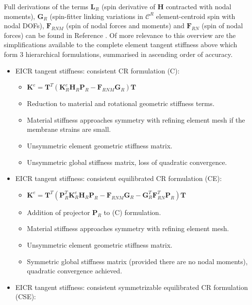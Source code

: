  Full derivations of the terms $\mathbf{L}_R$ (spin derivative of $\mathbf{H}$ contracted with nodal moments), $\mathbf{G}_R$ (spin-fitter linking variations in $\mathscr{C}^R$ element-centroid spin with nodal DOFs), $\mathbf{F}_{RNM}$ (spin of nodal forces and moments) and $\mathbf{F}_{RN}$ (spin of nodal forces) can be found in Reference \cite{felippa2005unified}. Of more relevance to this overview are the simplifications available to the complete element tangent stiffness above which form 3 hierarchical formulations, summarised in ascending order of accuracy.
 
  \begin{itemize}
 	\item EICR tangent stiffness: consistent CR formulation (C):
 	\begin{itemize}
 		\item $\mathbf{K}^e 
 		=
 		\mathbf{T}^T
 		(
 		\mathbf{K}_R^e
 		\mathbf{H}_R
 		\mathbf{P}_R
 		-
 		\mathbf{F}_{RNM}
 		\mathbf{G}_R
 		)
 		\mathbf{T}$
		\item Reduction to material and rotational geometric stiffness terms.
		\item Material stiffness approaches symmetry with refining element mesh if the membrane strains are small.
 		\item Unsymmetric element geometric stiffness matrix.
 		\item Unsymmetric global stiffness matrix, loss of quadratic convergence.
 	\end{itemize}
 	\item EICR tangent stiffness: consistent equilibrated CR formulation (CE):
 	\begin{itemize}
 		\item $\mathbf{K}^e 
 		=
 		\mathbf{T}^T
 		(
 		\mathbf{P}_R^T
 		\mathbf{K}_R^e
 		\mathbf{H}_R
 		\mathbf{P}_R
 		-
 		\mathbf{F}_{RNM}
 		\mathbf{G}_R
 		-
 		\mathbf{G}_R^T
 		\mathbf{F}_{RN}^T
 		\mathbf{P}_R
 		)
 		\mathbf{T}$
 		\item Addition of projector $\mathbf{P}_R$ to (C) formulation.
 		\item Material stiffness approaches symmetry with refining element mesh.
 		\item Unsymmetric element geometric stiffness matrix.
 		\item Symmetric global stiffness matrix (provided there are no nodal moments), quadratic convergence achieved.
 	\end{itemize}
 	\item EICR tangent stiffness: consistent symmetrizable equilibrated CR formulation (CSE):

\end{itemize}
